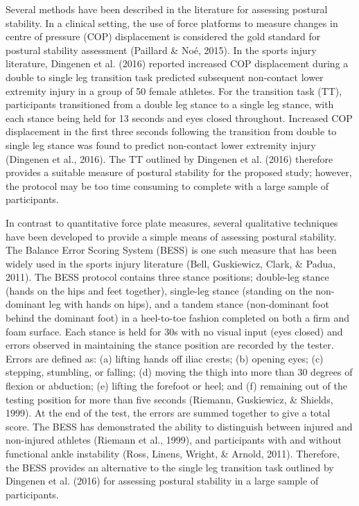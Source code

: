 \documentclass[
  english,
  man,floatsintext]{apa6}
\begin{document}
Several methods have been described in the literature for assessing postural stability.
In a clinical setting, the use of force platforms to measure changes in centre of pressure (COP) displacement is considered the gold standard for postural stability assessment (Paillard \& Noé, 2015).
In the sports injury literature, Dingenen et al. (2016) reported increased COP displacement during a double to single leg transition task predicted subsequent non-contact lower extremity injury in a group of 50 female athletes.
For the transition task (TT), participants transitioned from a double leg stance to a single leg stance, with each stance being held for 13 seconds and eyes closed throughout.
Increased COP displacement in the first three seconds following the transition from double to single leg stance was found to predict non-contact lower extremity injury (Dingenen et al., 2016).
The TT outlined by Dingenen et al. (2016) therefore provides a suitable measure of postural stability for the proposed study; however, the protocol may be too time consuming to complete with a large sample of participants.

In contrast to quantitative force plate measures, several qualitative techniques have been developed to provide a simple means of assessing postural stability.
The Balance Error Scoring System (BESS) is one such measure that has been widely used in the sports injury literature (Bell, Guskiewicz, Clark, \& Padua, 2011).
The BESS protocol contains three stance positions; double-leg stance (hands on the hips and feet together), single-leg stance (standing on the non-dominant leg with hands on hips), and a tandem stance (non-dominant foot behind the dominant foot) in a heel-to-toe fashion completed on both a firm and foam surface.
Each stance is held for 30s with no visual input (eyes closed) and errors observed in maintaining the stance position are recorded by the tester.
Errors are defined as: (a) lifting hands off iliac crests; (b) opening eyes; (c) stepping, stumbling, or falling; (d) moving the thigh into more than 30 degrees of flexion or abduction; (e) lifting the forefoot or heel; and (f) remaining out of the testing position for more than five seconds (Riemann, Guskiewicz, \& Shields, 1999).
At the end of the test, the errors are summed together to give a total score.
The BESS has demonstrated the ability to distinguish between injured and non-injured athletes (Riemann et al., 1999), and participants with and without functional ankle instability (Ross, Linens, Wright, \& Arnold, 2011).
Therefore, the BESS provides an alternative to the single leg transition task outlined by Dingenen et al. (2016) for assessing postural stability in a large sample of participants.
\end{document}
